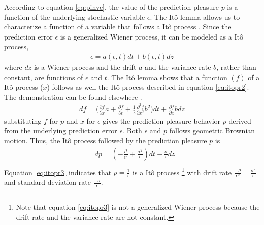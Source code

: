 \documentclass[11pt, onecolumn]{article}
\begin{document}
According to equation \ref{eq:pinve}, the value of the prediction pleasure $p$ is a function of the underlying stochastic variable $\epsilon$. The It\^{o} lemma allows us to characterize a function of a variable that follows a It\^{o} process \citep{ito_stochastic_1951}. Since the prediction error $\epsilon$ is a generalized Wiener process, it can be modeled as a It\^{o} process, 
\begin{equation*}
\begin{split}
   \epsilon = a(\epsilon,t)dt + b(\epsilon,t)dz
\end{split}
\label{eq:itopr}
\end{equation*}
where $dz$ is a Wiener process and the drift $a$ and the variance rate $b$, rather than constant, are functions of $\epsilon$ and $t$. The It\^{o} lemma shows that a function $(f)$ of a It\^{o} process ($x$) follows as well the It\^{o} process described in equation \ref{eq:itopr2}. The demonstration can be found elsewhere \citep{shreve_stochastic_2010}. 
\begin{equation}
\begin{split}
   df = \bigg(\frac{\partial f}{\partial x} a  + \frac{\partial f}{\partial t} + \frac{1}{2}\frac{\partial ^2 f}{\partial x^2} b^2 \bigg)dt + \frac{\partial f}{\partial x}b dz
\end{split}
\label{eq:itopr2}
\end{equation}
substituting $f$ for $p$ and $x$ for $\epsilon$ gives the prediction pleasure behavior $p$ derived from the underlying prediction error $\epsilon$. Both $\epsilon$ and $p$ follows geometric Brownian motion.
Thus, the It\^{o} process followed by the prediction pleasure $p$ is 
\begin{equation}
\begin{split}
 & dp =  (- \frac{\mu}{\epsilon^2} + \frac{\sigma^2}{\epsilon})dt - \frac{\sigma}{\epsilon}dz \\
\end{split}
\label{eq:itopr3}
\end{equation}
Equation \ref{eq:itopr3} indicates that $p = \frac{1}{\epsilon}$ is a It\^{o} process \footnote{Note that equation \ref{eq:itopr3} is not a generalized Wiener process because the drift rate and the variance rate are not constant.} with drift rate $\frac{-\mu}{\epsilon^2} + \frac{\sigma^2}{\epsilon}$ and standard deviation rate $\frac{-\sigma}{\epsilon}$.
\end{document}
